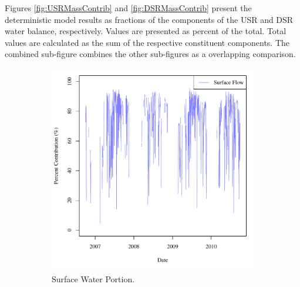 Figures \ref{fig:USRMassContrib} and \ref{fig:DSRMassContrib} present the deterministic model results as fractions of the components of the USR and DSR water balance, respectively.  Values are presented as percent of the total.  Total values are calculated as the sum of the respective constituent components.  The combined sub-figure combines the other sub-figures as a overlapping comparison.  

\begin{figure}[htbp]
	\centering
	\begin{subfigure}{0.5\textwidth}
		\centering
		\includegraphics[width=\tableCustomSize]{"Figures/Results_USR/Stochastic/M Mass Contrib 1"}
		\caption{Surface Water Portion.}
	\end{subfigure}%
	\begin{subfigure}{0.5\textwidth}
		\centering

\end{subfigure}
\end{figure}

